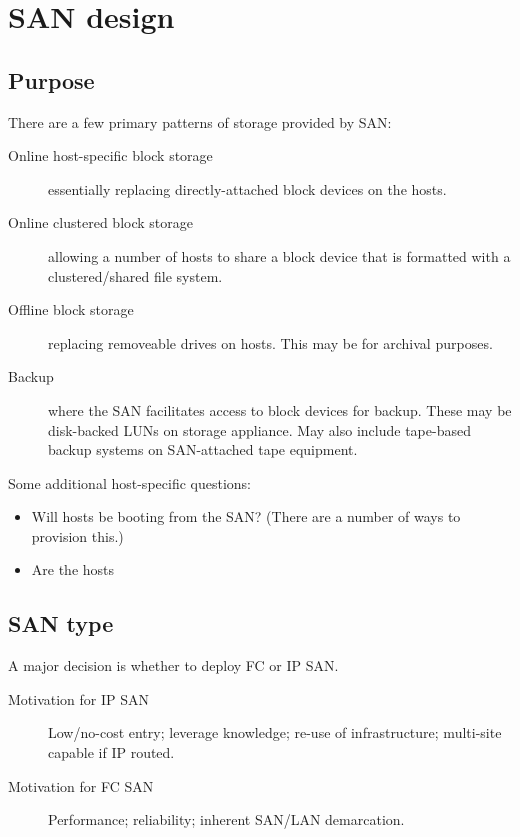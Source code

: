 \chapter{SAN design}
\label{ch:san-design}

\section{Purpose}
\label{sec:purpose}

There are a few primary patterns of storage provided by SAN:

\begin{description}
\item[Online host-specific block storage]
essentially replacing directly-attached block devices on the hosts.
\item[Online clustered block storage]
allowing a number of hosts to share a block device that is formatted
with a clustered/shared file system.
\item[Offline block storage]
replacing removeable drives on hosts. This may be for archival purposes.
\item[Backup]
where the SAN facilitates access to block devices for backup. These may
be disk-backed LUNs on storage appliance. May also include tape-based
backup systems on SAN-attached tape equipment.
\end{description}

Some additional host-specific questions:

\begin{itemize}
\item
  Will hosts be booting from the SAN? (There are a number of ways to
  provision this.)
\item
  Are the hosts
\end{itemize}

\section{SAN type}
\label{sec:san-type}

A major decision is whether to deploy FC or IP SAN.

\begin{description}
\item[Motivation for IP SAN]
Low/no-cost entry; leverage knowledge; re-use of infrastructure;
multi-site capable if IP routed.
\item[Motivation for FC SAN]
Performance; reliability; inherent SAN/LAN demarcation.
\end{description}

